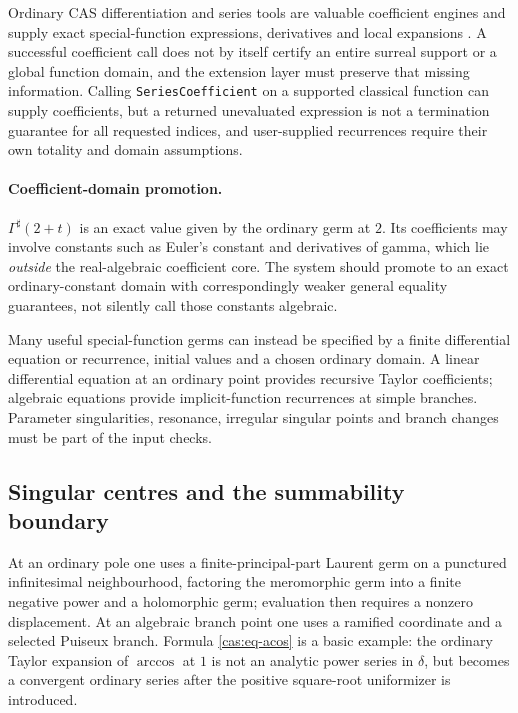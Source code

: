 \documentclass[11pt,letterpaper]{article}
\numberwithin{equation}{section}
\theoremstyle{definition}
\theoremstyle{remark}
\newcommand{\sh}{^{\sharp}}
\begin{document}
Ordinary CAS differentiation and series tools are valuable coefficient engines
and supply exact special-function expressions, derivatives and local expansions
\cite{cas:WLSpecial}. A successful coefficient call does not by itself certify
an entire surreal support or a global function domain, and the extension layer
must preserve that missing information. Calling \texttt{SeriesCoefficient} on a
supported classical function can supply coefficients, but a returned unevaluated
expression is not a termination guarantee for all requested indices, and
user-supplied recurrences require their own totality and domain assumptions.

\paragraph{Coefficient-domain promotion.}
$\Gamma\sh(2+t)$ is an exact value given by the ordinary germ at $2$. Its
coefficients may involve constants such as Euler's constant and derivatives of
gamma, which lie \emph{outside} the real-algebraic coefficient core. The system
should promote to an exact ordinary-constant domain with correspondingly weaker
general equality guarantees, not silently call those constants algebraic.

Many useful special-function germs can instead be specified by a finite
differential equation or recurrence, initial values and a chosen ordinary
domain. A linear differential equation at an ordinary point provides recursive
Taylor coefficients; algebraic equations provide implicit-function recurrences
at simple branches. Parameter singularities, resonance, irregular singular
points and branch changes must be part of the input checks.

\subsection{Singular centres and the summability boundary}
\label{cas:sub-singular}
At an ordinary pole one uses a finite-principal-part Laurent germ on a punctured
infinitesimal neighbourhood, factoring the meromorphic germ into a finite
negative power and a holomorphic germ; evaluation then requires a nonzero
displacement. At an algebraic branch point one uses a ramified coordinate and a
selected Puiseux branch. Formula \eqref{cas:eq-acos} is a basic example: the
ordinary Taylor expansion of $\arccos$ at $1$ is not an analytic power series in
$\delta$, but becomes a convergent ordinary series after the positive
square-root uniformizer is introduced.
\end{document}
